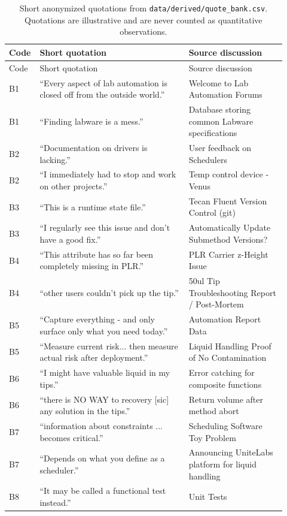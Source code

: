 \begin{longtable}{@{}p{0.06\linewidth}p{0.52\linewidth}p{0.34\linewidth}@{}}
\caption{Short anonymized quotations from \texttt{data/derived/quote\_bank.csv}. Quotations are illustrative and are never counted as quantitative observations.}
\label{tab:s-quotations}\\
\toprule
Code & Short quotation & Source discussion \\
\midrule
\endfirsthead
\toprule
Code & Short quotation & Source discussion \\
\midrule
\endhead
\bottomrule
\endfoot
B1 & ``Every aspect of lab automation is closed off from the outside world.'' & Welcome to Lab Automation Forums \\
B1 & ``Finding labware is a mess.'' & Database storing common Labware specifications \\
B2 & ``Documentation on drivers is lacking.'' & User feedback on Schedulers \\
B2 & ``I immediately had to stop and work on other projects.'' & Temp control device - Venus \\
B3 & ``This is a runtime state file.'' & Tecan Fluent Version Control (git) \\
B3 & ``I regularly see this issue and don't have a good fix.'' & Automatically Update Submethod Versions? \\
B4 & ``This attribute has so far been completely missing in PLR.'' & PLR Carrier z-Height Issue \\
B4 & ``other users couldn't pick up the tip.'' & 50ul Tip Troubleshooting Report / Post-Mortem \\
B5 & ``Capture everything - and only surface only what you need today.'' & Automation Report Data \\
B5 & ``Measure current risk... then measure actual risk after deployment.'' & Liquid Handling Proof of No Contamination \\
B6 & ``I might have valuable liquid in my tips.'' & Error catching for composite functions \\
B6 & ``there is NO WAY to recovery [sic] any solution in the tips.'' & Return volume after method abort \\
B7 & ``information about constraints ... becomes critical.'' & Scheduling Software Toy Problem \\
B7 & ``Depends on what you define as a scheduler.'' & Announcing UniteLabs platform for liquid handling \\
B8 & ``It may be called a functional test instead.'' & Unit Tests \\

\end{longtable}
